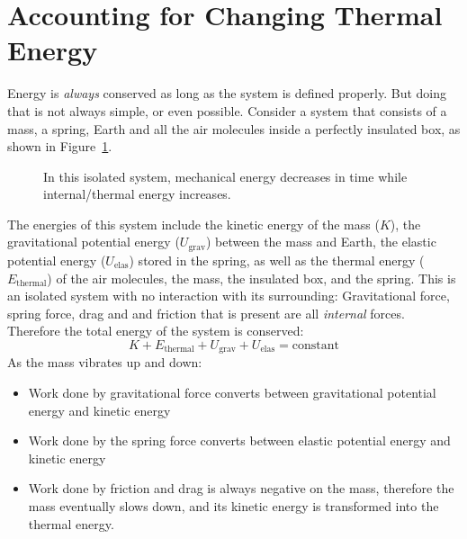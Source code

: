 \section{Accounting for Changing Thermal Energy}
Energy is \emph{always} conserved as long as the system is defined properly.
But doing that is not always simple, or even possible. Consider a system that
consists of a mass, a spring, Earth and all the air molecules inside a
perfectly insulated box, as shown in Figure~\ref{fig:isolated-with-thermal}.
\begin{figure}[ht]
  \centering
  \caption{In this isolated system, mechanical energy decreases in time while
    internal/thermal energy increases.}
  \label{fig:isolated-with-thermal}
\end{figure}
The energies of this system include the kinetic energy of the mass ($K$), the
gravitational potential energy ($U_\text{grav}$) between the mass and Earth, the
elastic potential energy ($U_\text{elas}$) stored in the spring, as well as the
thermal energy ($E_\text{thermal}$) of the air molecules, the mass, the
insulated box, and the spring. This is an isolated system with no interaction
with its surrounding: Gravitational force, spring force, drag and and friction
that is present are all \emph{internal} forces. Therefore the total energy of
the system is conserved:%
\begin{equation*}
  K + E_\text{thermal}+U_\text{grav}+U_\text{elas}=\text{constant}
\end{equation*}
As the mass vibrates up and down:
\begin{itemize}[itemsep=6pt]
\item Work done by gravitational force converts between gravitational potential
  energy and kinetic energy
\item Work done by the spring force converts between elastic potential energy
  and kinetic energy
\item Work done by friction and drag is always negative on the mass, therefore
  the mass eventually slows down, and its kinetic energy is transformed into
  the thermal energy.
\end{itemize}

